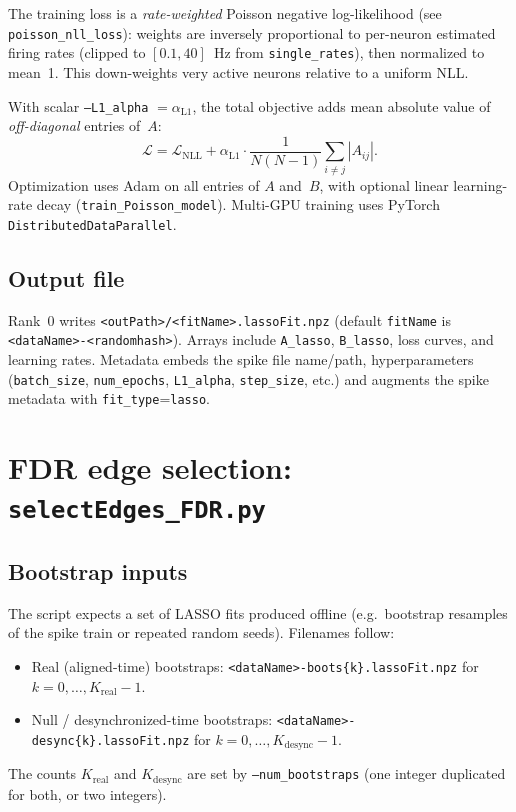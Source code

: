 \documentclass[11pt]{article}
\begin{document}
The training loss is a \emph{rate-weighted} Poisson negative log-likelihood (see \texttt{poisson\_nll\_loss}): weights are inversely proportional to per-neuron estimated firing rates (clipped to $[0.1,40]$~Hz from \texttt{single\_rates}), then normalized to mean~1. This down-weights very active neurons relative to a uniform NLL.

With scalar \texttt{--L1\_alpha} $=\alpha_{\mathrm{L1}}$, the total objective adds mean absolute value of \emph{off-diagonal} entries of~$A$:
\begin{equation}
  \mathcal{L} = \mathcal{L}_{\mathrm{NLL}} + \alpha_{\mathrm{L1}}\cdot \frac{1}{N(N-1)}\sum_{i\neq j}|A_{ij}|.
\end{equation}
Optimization uses Adam on all entries of $A$ and~$B$, with optional linear learning-rate decay (\texttt{train\_Poisson\_model}). Multi-GPU training uses PyTorch \texttt{DistributedDataParallel}.

\subsection{Output file}

Rank~0 writes \texttt{<outPath>/<fitName>.lassoFit.npz} (default \texttt{fitName} is \texttt{<dataName>-<randomhash>}). Arrays include \texttt{A\_lasso}, \texttt{B\_lasso}, loss curves, and learning rates. Metadata embeds the spike file name/path, hyperparameters (\texttt{batch\_size}, \texttt{num\_epochs}, \texttt{L1\_alpha}, \texttt{step\_size}, etc.) and augments the spike metadata with \texttt{fit\_type}=\texttt{lasso}.

\section{FDR edge selection: \texttt{selectEdges\_FDR.py}}
\label{sec:fdr}

\subsection{Bootstrap inputs}

The script expects a set of LASSO fits produced offline (e.g.\ bootstrap resamples of the spike train or repeated random seeds). Filenames follow:
\begin{itemize}
  \item Real (aligned-time) bootstraps: \texttt{<dataName>-boots\{k\}.lassoFit.npz} for $k=0,\ldots,K_{\mathrm{real}}-1$.
  \item Null / desynchronized-time bootstraps: \texttt{<dataName>-desync\{k\}.lassoFit.npz} for $k=0,\ldots,K_{\mathrm{desync}}-1$.
\end{itemize}
The counts $K_{\mathrm{real}}$ and $K_{\mathrm{desync}}$ are set by \texttt{--num\_bootstraps} (one integer duplicated for both, or two integers).
\end{document}
